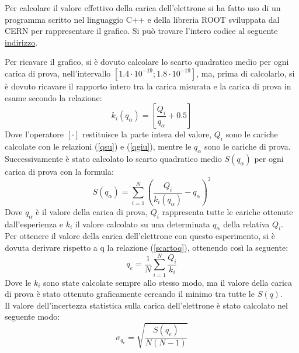 \documentclass{article}
\begin{document}
Per calcolare il valore effettivo della carica dell'elettrone si ha fatto uso di un programma scritto nel linguaggio C++ e della libreria ROOT sviluppata dal CERN per rappresentare il grafico. Si può trovare l'intero codice al seguente \href{https://github.com/definetly-not-carl/millikan/blob/master/millikan.cpp}{indirizzo}.

Per ricavare il grafico, si è dovuto calcolare lo scarto quadratico medio per ogni carica di prova, nell'intervallo $[1.4\cdot10^{-19};1.8\cdot 10^{-19}]$, ma, prima di calcolarlo, si è dovuto ricavare il rapporto intero tra la carica misurata e la carica di prova in esame secondo la relazione:
\begin{equation}
	k_i(q_\alpha)=\left[\frac{Q_i}{q_{\alpha}}+0.5\right]
\end{equation}
Dove l'operatore $[\cdot]$ restituisce la parte intera del valore, $Q_i$ sono le cariche calcolate con le relazioni (\ref{qsu}) e (\ref{qgiu}), mentre le $q_{\alpha}$ sono le cariche di prova.\\

Successivamente è stato calcolato lo scarto quadratico medio $S(q_{\alpha})$ per ogni carica di prova con la formula:
\begin{equation}
	S(q_{\alpha})=\sum_{i=1}^N\left(\frac{Q_i}{k_i(q_{\alpha})}-q_{\alpha}\right)^2
	\label{scartoq}
\end{equation}
Dove $q_{\alpha}$ è il valore della carica di prova, $Q_i$ rappresenta tutte le cariche ottenute dall'esperienza e $k_i$ il valore calcolato su una determinata $q_{\alpha}$ della relativa $Q_i$.\\

Per ottenere il valore della carica dell'elettrone con questo esperimento, si è dovuta derivare rispetto a q la relazione (\ref{scartoq}), ottenendo così la seguente:
\begin{equation}
	q_e=\frac 1N\sum^N_{i=1}\frac{Q_i}{k_i}
\end{equation}
Dove le $k_i$ sono state calcolate sempre allo stesso modo, ma il valore della carica di prova è stato ottenuto graficamente cercando il minimo tra tutte le $S(q)$.\\

Il valore dell'incertezza statistica sulla carica dell'elettrone è stato calcolato nel seguente modo:
\begin{equation}
	\sigma_{q_e}=\sqrt{\frac{S(q_e)}{N(N-1)}}
	\label{sigmaqe}
\end{equation}\\
\end{document}
